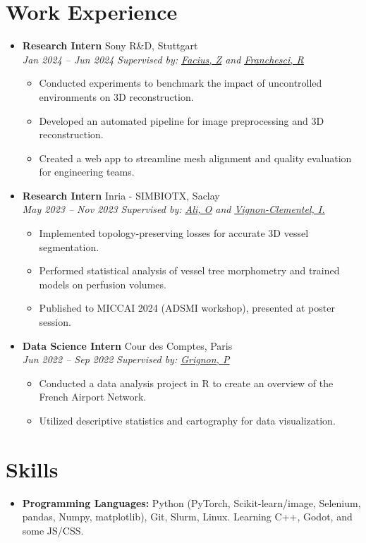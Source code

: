 \documentclass[letterpaper,11pt,twocolumn]{article}
\newcommand{\resumeItem}[1]{\item \small{#1}}
\newcommand{\resumeSubheading}[4]{
  \vspace{-2pt}\item \textbf{#1} \hfill #2 \\
  \textit{\small #3} \hfill \textit{\small #4} 
  \vspace{-7pt}
}
\newcommand{\resumeItemListStart}{\begin{itemize}[leftmargin=*]}
\newcommand{\resumeItemListEnd}{\end{itemize}\vspace{-5pt}}
\begin{document}
\section{Work Experience}
\begin{itemize}[leftmargin=*]
  \resumeSubheading
    {Research Intern}{Sony R\&D, Stuttgart}{Jan 2024 -- Jun 2024}{\textit{Supervised by: \href{https://de.linkedin.com/in/zoltan-facius-6b424112}{\underline{Facius, Z}} and \href{https://de.linkedin.com/in/roberto-franceschi}{\underline{Franchesci, R}}}}
    
  \resumeItemListStart
    \resumeItem{Conducted experiments to benchmark the impact of uncontrolled environments on 3D reconstruction.}
    \resumeItem{Developed an automated pipeline for image preprocessing and 3D reconstruction.}
    \resumeItem{Created a web app to streamline mesh alignment and quality evaluation for engineering teams.}
  \resumeItemListEnd

  \resumeSubheading
    {Research Intern}{Inria - SIMBIOTX, Saclay}{May 2023 -- Nov 2023}{\textit{Supervised by: \href{https://scholar.google.com/citations?user=tKRo0ewAAAAJ&hl=en}{\underline{Ali, O}} and \href{https://team.inria.fr/simbiotx/team-members/irene-vignon-clementel/}{\underline{Vignon-Clementel, I.}}}}
    
  \resumeItemListStart
    \resumeItem{Implemented topology-preserving losses for accurate 3D vessel segmentation.}
    \resumeItem{Performed statistical analysis of vessel tree morphometry and trained models on perfusion volumes.}
    \resumeItem{Published to MICCAI 2024 (ADSMI workshop), presented at poster session.}
  \resumeItemListEnd

  \resumeSubheading
    {Data Science Intern}{Cour des Comptes, Paris}{Jun 2022 -- Sep 2022}{\textit{Supervised by: \href{https://fr.linkedin.com/in/paulgrignon}{\underline{Grignon, P}}}}
    
  \resumeItemListStart
    \resumeItem{Conducted a data analysis project in R to create an overview of the French Airport Network.}
    \resumeItem{Utilized descriptive statistics and cartography for data visualization.}
  \resumeItemListEnd
\end{itemize}

\section{Skills}
\begin{itemize}[leftmargin=*]
  \item \textbf{Programming Languages:} Python (PyTorch, Scikit-learn/image, Selenium, pandas, Numpy, matplotlib), Git, Slurm, Linux. Learning C++, Godot, and some JS/CSS.
\end{itemize}
\end{document}
